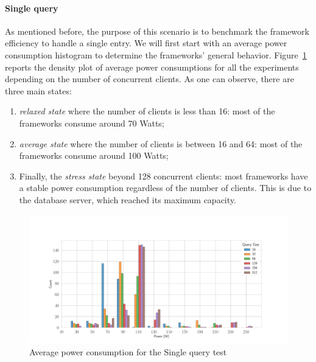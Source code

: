 \paragraph{Single query}
As mentioned before, the purpose of this scenario is to benchmark the framework efficiency to handle a single entry.
We will first start with an average power consumption histogram to determine the frameworks' general behavior.
Figure~\ref{fig:av_power_db} reports the density plot of average power consumptions for all the experiments depending on the number of concurrent clients.
As one can observe, there are three main states:
\begin{enumerate}
    \item \emph{relaxed state} where the number of clients is less than 16: most of the frameworks consume around 70 Watts;
    \item \emph{average state} where the number of clients is between 16 and 64: most of the frameworks consume around 100 Watts;
    \item Finally, the \emph{stress state} beyond 128 concurrent clients: most frameworks have a stable power consumption regardless of the number of clients.
          This is due to the database server, which reached its maximum capacity.
\end{enumerate}

\begin{figure}[hbt]
    \centering
    \includegraphics[width=\textwidth,height=\textheight,keepaspectratio]{imgs/histogram_av_power_cpu_db}
    \caption{Average power consumption for the Single query test }
    \label{fig:av_power_db}
\end{figure}

